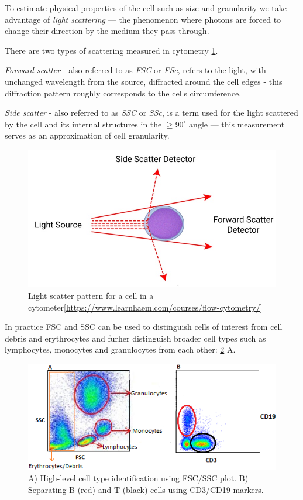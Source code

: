 To estimate physical properties of the cell such as size and granularity we take advantage of \emph{light scattering} --- the phenomenon where photons are forced to change their direction by the medium they pass through\cite{scatter98}.

There are two types of scattering measured in cytometry \cref{fig:scatter}.

\emph{Forward scatter} - also referred to as \emph{FSC} or \emph{FSc},  refers to the light, with unchanged wavelength from the source, diffracted around the cell edges - this diffraction pattern roughly corresponds to the cells circumference. 

\emph{Side scatter} - also referred to as \emph{SSC} or \emph{SSc}, is a term used for the light scattered by the cell and its internal structures in the $\geq90^{\circ}$ angle --- this measurement serves as an approximation of cell granularity\cite{fundcyto2011bake}.
\begin{figure}
  \includegraphics[width=0.65\linewidth]{img/ssc_fsc.jpg}
  \caption{Light scatter pattern for a cell in a cytometer[\url{https://www.learnhaem.com/courses/flow-cytometry/}]}
  \label{fig:scatter}
\end{figure}

In practice FSC and SSC can be used to distinguish cells of interest from cell debris and erythrocytes and furher distinguish broader cell types such as  lymphocytes, monocytes and granulocytes from each other: \cref{fig:gates} A. 

\begin{figure}
  \includegraphics[width=0.75\linewidth]{img/gating.png}
  \caption{A) High-level cell type identification using FSC/SSC plot. B) Separating B (red) and T (black) cells using CD3/CD19 markers.}
  \label{fig:gates}
\end{figure}

